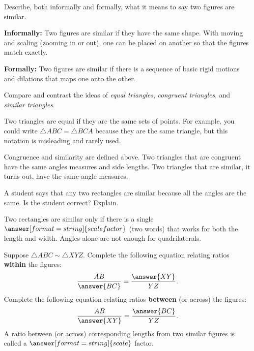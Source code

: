 \documentclass[nooutcomes]{ximera}
\begin{document}
\begin{question}
Describe, both informally and formally, what it means to say two figures are similar.
\begin{freeResponse}
\end{freeResponse}
\begin{hint}
\textbf{Informally:}  Two figures are similar if they have the same shape.  With moving and scaling (zooming in or out), one can be placed on another so that the figures match exactly.    

\textbf{Formally:}  Two figures are similar if there is a sequence of basic rigid motions and dilations that maps one onto the other.  
\end{hint}
\end{question}


\begin{question}
Compare and contrast the ideas of \textit{equal triangles},
  \textit{congruent triangles}, and \textit{similar triangles}.
\begin{freeResponse}
\end{freeResponse}
\begin{hint}
Two triangles are equal if they are the same sets of points.  For example, you could write $\triangle ABC = \triangle BCA$ because they are the same triangle, but this notation is misleading and rarely used.  

Congruence and similarity are defined above.  Two triangles that are congruent have the same angles measures and side lengths.  Two triangles that are similar, it turns out, have the same angle measures.  
\end{hint}
\end{question}

\begin{question}
A student says that any two rectangles are similar because all the angles are the same.  Is the student correct?  
 Explain. 
\begin{freeResponse}
\end{freeResponse}
\begin{feedback}
Two rectangles are similar only if there is a single $\answer[format=string]{scale factor}$ (two words) that works for both the length and width.  Angles alone are not enough for quadrilaterals.  
\end{feedback}
\end{question}


\begin{question}
Suppose $\triangle ABC \sim \triangle XYZ$.  Complete the following equation relating ratios \textbf{within} the figures: 
\[
\frac{AB}{\answer{BC}} = \frac{\answer{XY}}{YZ}.  
\]
Complete the following equation relating ratios \textbf{between} (or across) the figures: 
\[
\frac{AB}{\answer{XY}} = \frac{\answer{BC}}{YZ}.  
\]
A ratio between (or across) corresponding lengths from two similar figures is called a $\answer[format=string]{scale}$ factor.  
\end{question}
\end{document}
